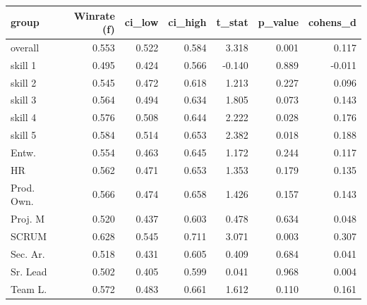 \begin{tabular}{lrrrrrr}
\toprule
group & Winrate (f) & ci\_low & ci\_high & t\_stat & p\_value & cohens\_d \\
\midrule
overall & 0.553 & 0.522 & 0.584 & 3.318 & 0.001 & 0.117 \\
skill 1 & 0.495 & 0.424 & 0.566 & -0.140 & 0.889 & -0.011 \\
skill 2 & 0.545 & 0.472 & 0.618 & 1.213 & 0.227 & 0.096 \\
skill 3 & 0.564 & 0.494 & 0.634 & 1.805 & 0.073 & 0.143 \\
skill 4 & 0.576 & 0.508 & 0.644 & 2.222 & 0.028 & 0.176 \\
skill 5 & 0.584 & 0.514 & 0.653 & 2.382 & 0.018 & 0.188 \\
Entw. & 0.554 & 0.463 & 0.645 & 1.172 & 0.244 & 0.117 \\
HR & 0.562 & 0.471 & 0.653 & 1.353 & 0.179 & 0.135 \\
Prod. Own. & 0.566 & 0.474 & 0.658 & 1.426 & 0.157 & 0.143 \\
Proj. M & 0.520 & 0.437 & 0.603 & 0.478 & 0.634 & 0.048 \\
SCRUM & 0.628 & 0.545 & 0.711 & 3.071 & 0.003 & 0.307 \\
Sec. Ar. & 0.518 & 0.431 & 0.605 & 0.409 & 0.684 & 0.041 \\
Sr. Lead & 0.502 & 0.405 & 0.599 & 0.041 & 0.968 & 0.004 \\
Team L. & 0.572 & 0.483 & 0.661 & 1.612 & 0.110 & 0.161 \\
\bottomrule
\end{tabular}
